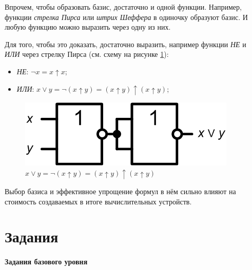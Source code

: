 Впрочем, чтобы образовать базис, достаточно и одной функции. Например, функции \emph{стрелка Пирса} или \emph{штрих Шеффера} в одиночку образуют базис. И любую функцию можно выразить через одну из них. 

Для того, чтобы это доказать, достаточно выразить, например функции \textit{НЕ} и \textit{ИЛИ} через стрелку Пирса (см. схему на рисунке \ref{fig::alog:orByNotOr}):
\begin{itemize}
    \item \textit{НЕ}: $\lnot x=x\uparrow x$;
    \item \textit{ИЛИ}: $x\lor y=\lnot(x\uparrow y)=(x\uparrow y)\uparrow(x\uparrow y)$;
\end{itemize}

\begin{figure}[!ht]
    \centering
    \includegraphics[width=.45\textwidth]{fig/orByNotOr}
    \caption{$x\lor y=\lnot(x\uparrow y)=(x\uparrow y)\uparrow(x\uparrow y)$}
    \label{fig::alog:orByNotOr}
\end{figure} 

Выбор базиса и эффективное упрощение формул в нём сильно влияют на стоимость создаваемых в итоге вычислительных устройств.


\section*{Задания}


\paragraph{Задания базового уровня}

